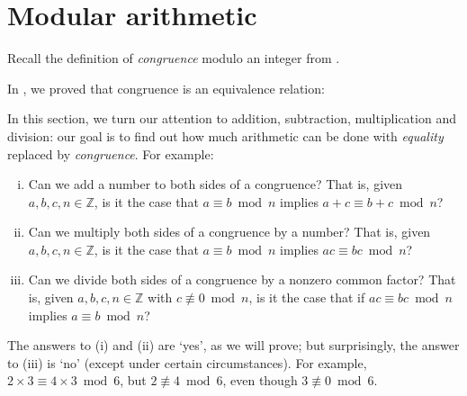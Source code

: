 \section{Modular arithmetic}

Recall the definition of \textit{congruence} modulo an integer from .

\rdefCongruence*

In , we proved that congruence is an equivalence relation:

\rthmCongruenceIsEquivalenceRelation*

In this section, we turn our attention to addition, subtraction, multiplication and division: our goal is to find out how much arithmetic can be done with \textit{equality} replaced by \textit{congruence}. For example:
\begin{enumerate}[(i)]
\item Can we add a number to both sides of a congruence? That is, given $a,b,c,n \in \mathbb{Z}$, is it the case that $a \equiv b \bmod n$ implies $a + c \equiv b + c \bmod n$?
\item Can we multiply both sides of a congruence by a number? That is, given $a,b,c,n \in \mathbb{Z}$, is it the case that $a \equiv b \bmod n$ implies $ac \equiv bc \bmod n$?
\item Can we divide both sides of a congruence by a nonzero common factor? That is, given $a,b,c,n \in \mathbb{Z}$ with $c \not\equiv 0 \bmod n$, is it the case that if $ac \equiv bc \bmod n$ implies $a \equiv b \bmod n$?
\end{enumerate}

The answers to (i) and (ii) are `yes', as we will prove; but surprisingly, the answer to (iii) is `no' (except under certain circumstances). For example, $2 \times 3 \equiv 4 \times 3 \bmod 6$, but $2 \not\equiv 4 \bmod 6$, even though $3 \not\equiv 0 \bmod 6$.

